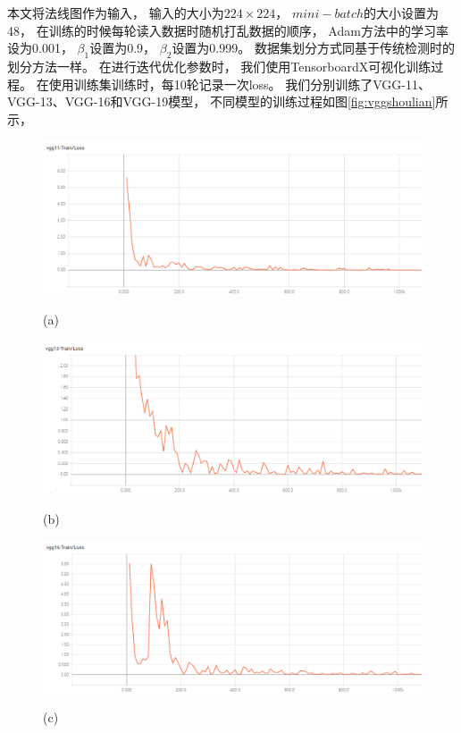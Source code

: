 本文将法线图作为输入，
输入的大小为$224\times224$，
$mini-batch$的大小设置为48，
在训练的时候每轮读入数据时随机打乱数据的顺序，
Adam方法中的学习率设为0.001，
$\beta_1$设置为0.9，
$\beta_2$设置为0.999。
数据集划分方式同基于传统检测时的划分方法一样。
在进行迭代优化参数时，
我们使用TensorboardX可视化训练过程。
在使用训练集训练时，每10轮记录一次loss。
我们分别训练了VGG-11、VGG-13、VGG-16和VGG-19模型，
不同模型的训练过程如图\ref{fig:vggshoulian}所示，
\begin{figure}[htbp]
\centering
\begin{minipage}{0.8\linewidth}
\centerline{\includegraphics[width=1.0\linewidth]{figures/vgg11.png}}
\centerline{(a)}
\end{minipage}

\begin{minipage}{0.8\linewidth}
\centerline{\includegraphics[width=1.0\linewidth]{figures/vgg13.png}}
\centerline{(b)}
\end{minipage}

\begin{minipage}{0.8\linewidth}
\centerline{\includegraphics[width=1.0\linewidth]{figures/vgg16.png}}
\centerline{(c)}
\end{minipage}


\end{figure}

